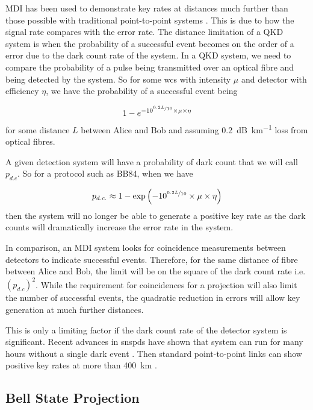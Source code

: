 \Ac{MDI} has been used to demonstrate key rates at distances much further than those possible with traditional point-to-point systems \cite{yin2016}. This is due to how the signal rate compares with the error rate. The distance limitation of a \ac{QKD} system is when the probability of a successful event becomes on the order of a error due to the dark count rate of the system. In a \ac{QKD} system, we  need to compare the probability of a pulse being transmitted over an optical fibre and being detected by the system. So for some \ac{wcs} with intensity $\mu$ and detector with efficiency $\eta$, we have the probability of a successful event being

\begin{equation}
	1 - e^{-10^{\nicefrac{0.2 L}{10}} \times \mu \times \eta}
\end{equation}
for some distance $L$ between Alice and Bob and assuming \SI{0.2}{dB\per\km} loss from optical fibres.

A given detection system will have a probability of dark count that we will call $p_{d.c}$. So for a protocol such as BB84, when we have

\begin{equation}
	p_{d.c.} \approx 1 - \mathrm{exp}\left(-10^{\nicefrac{0.2 L}{10}} \times \mu \times \eta\right)
\end{equation}
then the system will no longer be able to generate a positive key rate as the dark counts will dramatically increase the error rate in the system.

In comparison, an \ac{MDI} system looks for coincidence measurements between detectors to indicate successful events. Therefore, for the same distance of fibre between Alice and Bob, the limit will be on the square of the dark count rate i.e.  $(p_{d.c})^2$. While the requirement for coincidences for a projection will also limit the number of successful events, the quadratic reduction in errors will allow key generation at much further distances.

This is only a limiting factor if the dark count rate of the detector system is significant. Recent advances in \acp{snspd} have shown that system can run for many hours without a single dark event \cite{wollman2017}. Then standard point-to-point links can show positive key rates at more than \SI{400}{\km} \cite{Boaron2018}.

\subsection{Bell State Projection}

